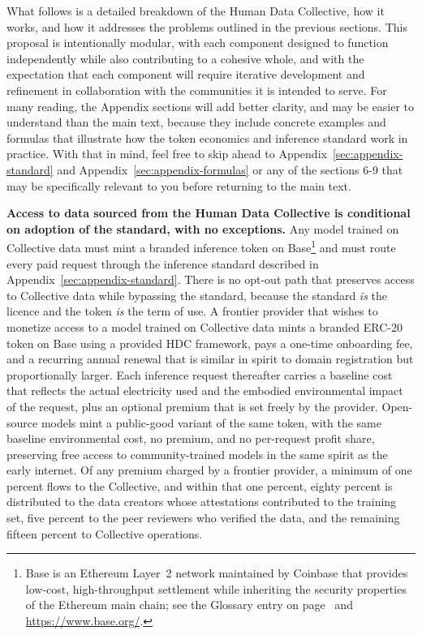 \documentclass[10pt,a4paper,twocolumn]{article}
\begin{document}
What follows is a detailed breakdown of the Human Data Collective, how it works, and how it addresses the problems outlined in the previous sections. This proposal is intentionally modular, with each component designed to function independently while also contributing to a cohesive whole, and with the expectation that each component will require iterative development and refinement in collaboration with the communities it is intended to serve. For many reading, the Appendix sections will add better clarity, and may be easier to understand than the main text, because they include concrete examples and formulas that illustrate how the token economics and inference standard work in practice. With that in mind, feel free to skip ahead to Appendix~\ref{sec:appendix-standard} and Appendix~\ref{sec:appendix-formulas} or any of the sections 6-9 that may be specifically relevant to you before returning to the main text.

\textbf{Access to data sourced from the Human Data Collective is conditional on adoption of the standard, with no exceptions.} Any model trained on Collective data must mint a branded inference token on Base\footnote{Base is an Ethereum Layer~2 network maintained by Coinbase that provides low-cost, high-throughput settlement while inheriting the security properties of the Ethereum main chain; see the Glossary entry on page~\pageref{sec:appendix-glossary} and \url{https://www.base.org/}.} and must route every paid request through the inference standard described in Appendix~\ref{sec:appendix-standard}. There is no opt-out path that preserves access to Collective data while bypassing the standard, because the standard \emph{is} the licence and the token \emph{is} the term of use. A frontier provider that wishes to monetize access to a model trained on Collective data mints a branded ERC-20 token on Base using a provided HDC framework, pays a one-time onboarding fee, and a recurring annual renewal that is similar in spirit to domain registration but proportionally larger. Each inference request thereafter carries a baseline cost that reflects the actual electricity used and the embodied environmental impact of the request, plus an optional premium that is set freely by the provider. Open-source models mint a public-good variant of the same token, with the same baseline environmental cost, no premium, and no per-request profit share, preserving free access to community-trained models in the same spirit as the early internet. Of any premium charged by a frontier provider, a minimum of one percent flows to the Collective, and within that one percent, eighty percent is distributed to the data creators whose attestations contributed to the training set, five percent to the peer reviewers who verified the data, and the remaining fifteen percent to Collective operations.
\end{document}
